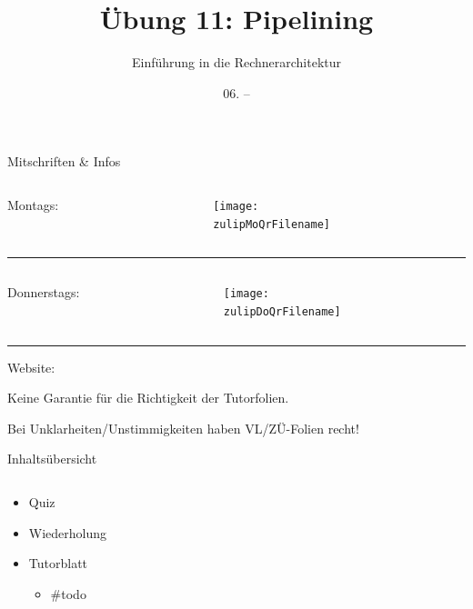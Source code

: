 \documentclass[
  german,            %
  aspectratio=169,    %
]{tumbeamer}
\title{Übung 11: Pipelining}
\subtitle{Einführung in die Rechnerarchitektur}
\author{\theAuthorName}
\institute{\theGroupName\\\theSchoolName\\\theUniversityName}
\date{06. -- \DTMdisplaydate{2025}{01}{12}{-1}}
\begin{document}
\maketitle

\begin{frame}[c]{Mitschriften \& Infos}{}
  \begin{minipage}[t]{\textwidth}
    \begin{columns}[c]
      \begin{column}{0.8\textwidth}
        Montags: \href{\zulipMo}{\zulipMo}
      \end{column}
      \begin{column}{0.2\textwidth}
        \texttt{[image: \\zulipMoQrFilename]}
      \end{column}
    \end{columns}
  \end{minipage}
  \rule{\textwidth}{0.4pt}
  \begin{minipage}[t]{\textwidth}
    \begin{columns}[c]
      \begin{column}{0.8\textwidth}
        Donnerstags: \href{\zulipDo}{\zulipDo}
      \end{column}
      \begin{column}{0.2\textwidth}
        \texttt{[image: \\zulipDoQrFilename]}
      \end{column}
    \end{columns}
  \end{minipage}
  \ifdefined\myWebsite
  \rule{\textwidth}{0.4pt}
  \centering
  Website: \href{\myWebsite}{\myWebsite}
  \fi
\end{frame}

\begin{frame}[c]{}{}
  \begin{center}
    \LARGE  Keine Garantie für die Richtigkeit der Tutorfolien.

    \Large Bei Unklarheiten/Unstimmigkeiten haben VL/ZÜ-Folien recht!
  \end{center}
\end{frame}

\begin{frame}[c]{Inhaltsübersicht}{}
  \begin{columns}[c]
    \begin{column}{1\textwidth}
      \begin{itemize}
        \item Quiz
        \item Wiederholung
        \item Tutorblatt
        \begin{itemize}
			\item \#todo
        \end{itemize}
      \end{itemize}
    \end{column}
  \end{columns}
\end{frame}
\end{document}
